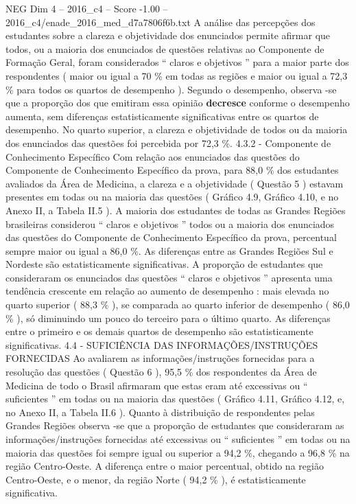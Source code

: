 \begin{textsample}{NEG Dim 4 – 2016\_c4 – Score -1.00 – 2016\_c4/enade\_2016\_med\_d7a7806f6b.txt}
A análise das percepções dos estudantes sobre a clareza e objetividade dos enunciados permite afirmar que todos, ou a maioria dos enunciados de questões relativas ao Componente de Formação Geral, foram considerados “ claros e objetivos ” para a maior parte dos respondentes ( maior ou igual a 70 \% em todas as regiões e maior ou igual a 72,3 \% para todos os quartos de desempenho ).
Segundo o desempenho, observa -se que a proporção dos que emitiram essa opinião \textbf{decresce} conforme o desempenho aumenta, sem diferenças estatisticamente significativas entre os quartos de desempenho.
No quarto superior, a clareza e objetividade de todos ou da maioria dos enunciados das questões foi percebida por 72,3 \%. 4.3.2 - Componente de Conhecimento Específico Com relação aos enunciados das questões do Componente de Conhecimento Específico da prova, para 88,0 \% dos estudantes avaliados da Área de Medicina, a clareza e a objetividade ( Questão 5 ) estavam presentes em todas ou na maioria das questões ( Gráfico 4.9, Gráfico 4.10, e no Anexo II, a Tabela II.5 ).
A maioria dos estudantes de todas as Grandes Regiões brasileiras considerou “ claros e objetivos ” todos ou a maioria dos enunciados das questões do Componente de Conhecimento Específico da prova, percentual sempre maior ou igual a 86,0 \%.
As diferenças entre as Grandes Regiões Sul e Nordeste são estatisticamente significativas.
A proporção de estudantes que consideraram os enunciados das questões “ claros e objetivos ” apresenta uma tendência crescente em relação ao aumento de desempenho : mais elevada no quarto superior ( 88,3 \% ), se comparada ao quarto inferior de desempenho ( 86,0 \% ), só diminuindo um pouco do terceiro para o último quarto.
As diferenças entre o primeiro e os demais quartos de desempenho são estatisticamente significativas. 4.4 - SUFICIÊNCIA DAS INFORMAÇÕES/INSTRUÇÕES FORNECIDAS Ao avaliarem as informações/instruções fornecidas para a resolução das questões ( Questão 6 ), 95,5 \% dos respondentes da Área de Medicina de todo o Brasil afirmaram que estas eram até excessivas ou “ suficientes ” em todas ou na maioria das questões ( Gráfico 4.11, Gráfico 4.12, e, no Anexo II, a Tabela II.6 ).
Quanto à distribuição de respondentes pelas Grandes Regiões observa -se que a proporção de estudantes que consideraram as informações/instruções fornecidas até excessivas ou “ suficientes ” em todas ou na maioria das questões foi sempre igual ou superior a 94,2 \%, chegando a 96,8 \% na região Centro-Oeste.
A diferença entre o maior percentual, obtido na região Centro-Oeste, e o menor, da região Norte ( 94,2 \% ), é estatisticamente significativa.

\end{textsample}
